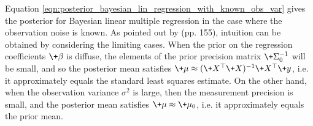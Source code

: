 \documentclass{article} %
\begin{document}
%

\begin{remark}{}
Equation \eqref{eqn:posterior_bayesian_lin_regression_with_known_obs_var}
gives the posterior for Bayesian linear multiple regression in the case where the observation noise is known.    As pointed out by \cite{hoff2009first} (pp. 155),  intuition can be obtained by considering the limiting cases.  When the prior on the regression coefficients $\+\beta$ is diffuse,  the elements of the prior precision matrix $\+\Sigma_0^{-1}$ will be small,  and so the posterior mean satisfies
$\+\mu \approx ( \+X^\top \+X)^{-1} \+X^\top \+y$,  i.e.  it approximately equals the standard least squares estimate.   On the other hand,   when the observation variance $\sigma^2$ is large,  then the measurement precision is small, and the posterior mean satisfies $\+\mu \approx \+\mu_0$,  i.e.  it approximately equals the prior mean.
\end{remark}
\end{document}
